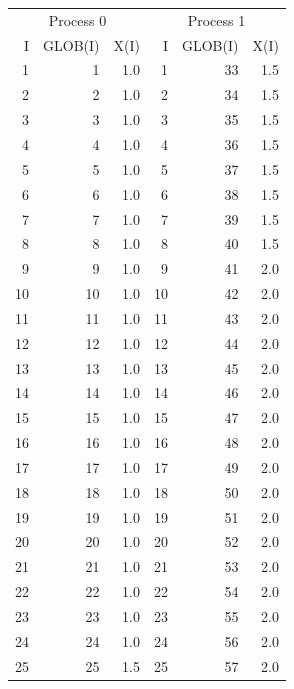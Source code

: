 \begin{table}
\begin{center}
\footnotesize
\begin{tabular}{rrr@{\hspace{6\tabcolsep}}rrr}
\multicolumn{3}{c}{Process  0}&
\multicolumn{3}{c}{Process  1}\\
  I  &   GLOB(I) & X(I)  &   I & GLOB(I) & X(I) \\
  1   &    1  &  1.0   &   1  &  33  &   1.5 \\ 
  2   &    2  &  1.0   &   2  &  34  &   1.5 \\
  3   &    3  &  1.0   &   3  &  35  &   1.5 \\
  4   &    4  &  1.0   &   4  &  36  &   1.5 \\
  5   &    5  &  1.0   &   5  &  37  &   1.5 \\
  6   &    6  &  1.0   &   6  &  38  &   1.5 \\
  7   &    7  &  1.0   &   7  &  39  &   1.5 \\
  8   &    8  &  1.0   &   8  &  40  &   1.5 \\
  9   &    9  &  1.0   &   9  &  41  &   2.0 \\
 10   &   10  &  1.0   &  10  &  42  &   2.0 \\
 11   &   11  &  1.0   &  11  &  43  &   2.0 \\
 12   &   12  &  1.0   &  12  &  44  &   2.0 \\
 13   &   13  &  1.0   &  13  &  45  &   2.0 \\
 14   &   14  &  1.0   &  14  &  46  &   2.0 \\
 15   &   15  &  1.0   &  15  &  47  &   2.0 \\
 16   &   16  &  1.0   &  16  &  48  &   2.0 \\
 17   &   17  &  1.0   &  17  &  49  &   2.0 \\
 18   &   18  &  1.0   &  18  &  50  &   2.0 \\
 19   &   19  &  1.0   &  19  &  51  &   2.0 \\
 20   &   20  &  1.0   &  20  &  52  &   2.0 \\ 
 21   &   21  &  1.0   &  21  &  53  &   2.0 \\
 22   &   22  &  1.0   &  22  &  54  &   2.0 \\
 23   &   23  &  1.0   &  23  &  55  &   2.0 \\
 24   &   24  &  1.0   &  24  &  56  &   2.0 \\
 25   &   25  &  1.5   &  25  &  57  &   2.0 \\

\end{tabular}
\end{center}
\end{table}
